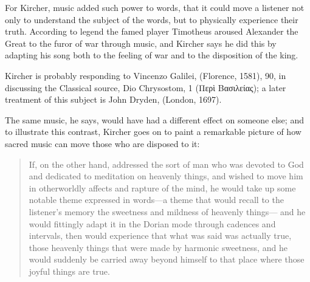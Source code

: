 For Kircher, music added such power to words, that it could move a listener not 
only to understand the subject of the words, but to physically experience their 
truth.
According to legend the famed  player Timotheus aroused Alexander 
the Great to the furor of war through music, and Kircher says he did this by 
adapting his song both to the feeling of war and to the disposition of the 
king.%
    \begin{Footnote}
        Kircher is probably responding to Vincenzo Galilei,  (Florence, 1581), 90, in discussing the Classical source, Dio 
        Chrysostom,  1 (\textgreek{Περὶ Βασιλείας});  a later 
        treatment of this subject is John Dryden,  (London, 1697).
    \end{Footnote}
The same music, he says, would have had a different effect on someone else; and 
to illustrate this contrast, Kircher goes on to paint a remarkable picture of 
how sacred music can move those who are disposed to it:
\begin{quote}
    If, on the other hand,  addressed the sort of man who was 
    devoted to God and dedicated to meditation on heavenly things,
    and wished to move him in otherworldly affects and rapture of the mind,
    he would take up some notable theme expressed in words---a theme that would 
    recall to the listener's memory the sweetness and mildness of heavenly things---
    and he would fittingly adapt it in the Dorian mode through cadences and 
    intervals,
    then  would experience that what was said was actually 
    true,
    those heavenly things that were made by harmonic sweetness,
    and he would suddenly be carried away beyond himself to that place where 
    those joyful things are true.%
        \Autocite
        [bk.~7, 550:
        .]
        {Kircher:Musurgia}
\end{quote}


